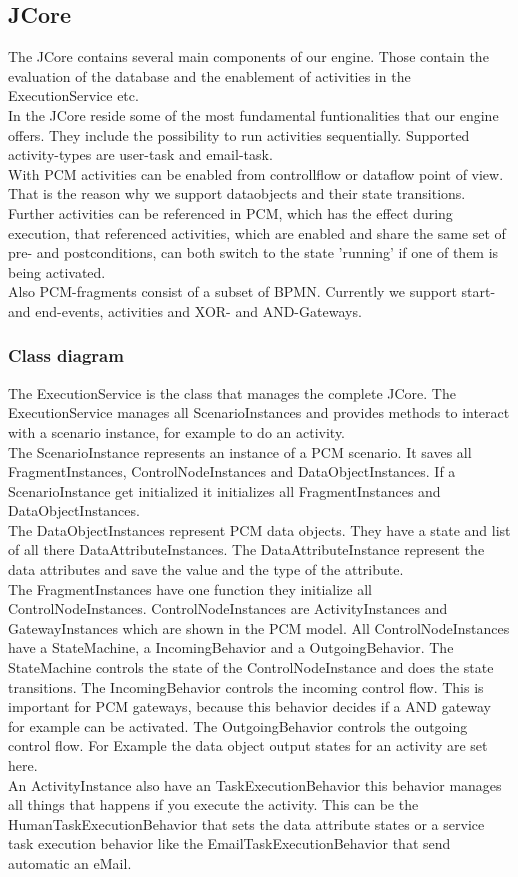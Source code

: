 
%
%
\subsection{JCore}
The JCore contains several main components of our engine. Those contain the evaluation of the database and the enablement of activities in the ExecutionService etc.\\
In the JCore reside some of the most fundamental funtionalities that our engine offers. They include the possibility to run activities sequentially. Supported activity-types are user-task and email-task.\\
With PCM activities can be enabled from controllflow or dataflow point of view. That is the reason why we support dataobjects and their state transitions. Further activities can be referenced in PCM, which has the effect during execution, that referenced activities, which are enabled and share the same set of pre- and postconditions, can both switch to the state 'running' if one of them is being activated.\\
Also PCM-fragments consist of a subset of BPMN. Currently we support start- and end-events, activities and XOR- and AND-Gateways.


\subsubsection{Class diagram}

The ExecutionService is the class that manages the complete JCore. The ExecutionService manages all ScenarioInstances and provides methods to interact with a scenario instance, for example to do an activity.\\
The ScenarioInstance represents an instance of a PCM scenario. It saves all FragmentInstances, ControlNodeInstances and DataObjectInstances. If a ScenarioInstance get initialized it initializes all FragmentInstances and DataObjectInstances.\\
The DataObjectInstances represent PCM data objects. They have a state and list of all there DataAttributeInstances. The DataAttributeInstance represent the data attributes and save the value and the type of the attribute.\\
The FragmentInstances have one function they initialize all ControlNodeInstances.
ControlNodeInstances are ActivityInstances and GatewayInstances which are shown in the PCM model. All ControlNodeInstances have a StateMachine,  a IncomingBehavior and a OutgoingBehavior. The StateMachine controls the state of the ControlNodeInstance and does the state transitions. The IncomingBehavior controls the incoming control flow. This is important for PCM gateways, because this behavior decides if a AND gateway for example can be activated. The OutgoingBehavior controls the outgoing control flow. For Example the data object output states for an activity are set here.\\
An ActivityInstance also have an TaskExecutionBehavior this behavior manages all things that happens if you execute the activity. This can be the HumanTaskExecutionBehavior that sets the data attribute states or a service task execution behavior like the EmailTaskExecutionBehavior that send automatic an eMail.\\

